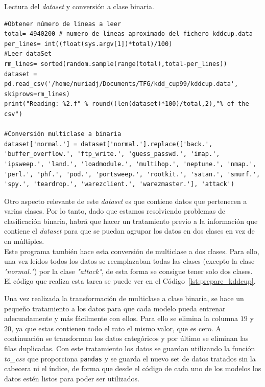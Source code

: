 \documentclass[a4paper, 12pt]{book}
\begin{document}
\begin{listing}[]
    \caption{Lectura del \textit{dataset} y conversión a clase binaria.}{}
    \label{lst:prepare_kddcup}
    \begin{verbatim}
#Obtener número de lineas a leer
total= 4940200 # numero de lineas aproximado del fichero kddcup.data
per_lines= int((float(sys.argv[1])*total)/100)
#Leer dataSet
rm_lines= sorted(random.sample(range(total),total-per_lines))
dataset = pd.read_csv('/home/nuriadj/Documents/TFG/kdd_cup99/kddcup.data', skiprows=rm_lines)
print("Reading: %2.f" % round((len(dataset)*100)/total,2),"% of the csv")

#Conversión multiclase a binaria
dataset['normal.'] = dataset['normal.'].replace(['back.', 'buffer_overflow.', 'ftp_write.', 'guess_passwd.', 'imap.', 'ipsweep.', 'land.', 'loadmodule.', 'multihop.', 'neptune.', 'nmap.', 'perl.', 'phf.', 'pod.', 'portsweep.', 'rootkit.', 'satan.', 'smurf.', 'spy.', 'teardrop.', 'warezclient.', 'warezmaster.'], 'attack')
    \end{verbatim}
\end{listing}

Otro aspecto relevante de este \textit{dataset} es que contiene datos que pertenecen a varias clases. Por lo tanto, dado que estamos resolviendo problemas de clasificación binaria, habrá que hacer un tratamiento previo a la información que contiene el \textit{dataset} para que se puedan agrupar los datos en dos clases en vez de en múltiples.\\
Este programa también hace esta conversión de multiclase a dos clases. Para ello, una vez leídos todos los datos se reemplazaban todas las clases (excepto la clase \textit{"normal."}) por la clase \textit{"attack"}\cite{MulticlassToBinary}, de esta forma se consigue tener solo dos clases. El código que realiza esta tarea se puede ver en el Código~\ref{lst:prepare_kddcup}.

Una vez realizada la transformación de multiclase a clase binaria, se hace un pequeño tratamiento a los datos para que cada modelo pueda entrenar adecuadamente y más fácilmente con ellos\cite{dataSetTreatment}. Para ello se elimina la columna $19$ y $20$, ya que estas contienen todo el rato el mismo valor, que es cero. A continuación se transforman los datos categóricos y por último se eliminan las filas duplicadas. Con este tratamiento los datos se guardan utilizando la función \textit{to\_csv} que proporciona \texttt{pandas} y se guarda el nuevo set de datos tratados sin la cabecera ni el índice, de forma que desde el código de cada uno de los modelos los datos estén listos para poder ser utilizados.
\end{document}
